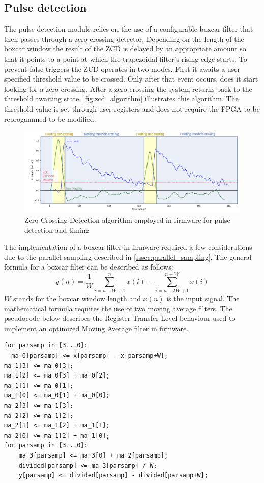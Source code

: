 \subsection{Pulse detection}
The pulse detection module relies on the use of a configurable boxcar filter
that then passes through a zero crossing detector. Depending on the
length of the boxcar window the result of the ZCD is delayed by an appropriate
amount so that it points to a point at which the trapezoidal filter's 
rising edge starts. To prevent false triggers the ZCD operates in two modes.
First it awaits a user specified threshold value to be crossed. Only after
that event occurs, does it start looking for a zero crossing.
After a zero crossing the system returns back to the threshold awaiting state.
\autoref{fig:zcd_algorithm} illustrates this algorithm. 
The threshold value is set through user registers and does not require
the FPGA to be reprogammed to be modified.

\begin{figure}[H]
  \centering
  \includegraphics[width=\linewidth]{media/zcd_algorithm.png}
  \caption{Zero Crossing Detection algorithm employed in firmware for pulse detection and timing}
  \label{fig:zcd_algorithm} 
\end{figure}


The implementation of a boxcar filter in firmware required a few considerations
due to the parallel sampling described in \autoref{sssec:parallel_sampling}.
The general formula for a boxcar filter can be described as follows:
$$y(n) = \frac{1}{W} \sum^n_{i=n-W+1}x(i) - \sum^{n-W}_{i=n-2W+1}x(i)$$
$W$ stands for the boxcar window length and $x(n)$ is the input signal.
The mathematical formula requires the use of two moving average filters.
The pseudocode below describes the Register Transfer Level behaviour 
used to implement an optimized Moving Average filter in firmware.

\begin{lstlisting}
for parsamp in [3...0]:
  ma_0[parsamp] <= x[parsamp] - x[parsamp+W];
ma_1[3] <= ma_0[3];
ma_1[2] <= ma_0[3] + ma_0[2];
ma_1[1] <= ma_0[1];
ma_1[0] <= ma_0[1] + ma_0[0];
ma_2[3] <= ma_1[3];
ma_2[2] <= ma_1[2];
ma_2[1] <= ma_1[2] + ma_1[1];
ma_2[0] <= ma_1[2] + ma_1[0];
for parsamp in [3...0]:
	ma_3[parsamp] <= ma_3[0] + ma_2[parsamp];
	divided[parsamp] <= ma_3[parsamp] / W;
	y[parsamp] <= divided[parsamp] - divided[parsamp+W];
\end{lstlisting}


